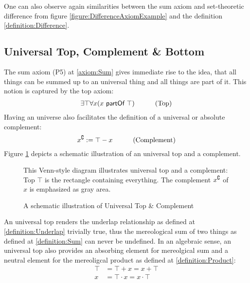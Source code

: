 One can also observe again similarities between the sum axiom and set-theoretic difference from figure \ref{figure:DifferenceAxiomExample} and the definition \ref{definition:Difference}.


\subsection{Universal Top, Complement \& Bottom}
\label{subsection:UniversalTopComplementAndBottom}
The sum axiom (P5) at \ref{axiom:Sum} gives immediate rise to the idea, that all things can be summed up to an universal thing and all things are part of it.
This notion is captured by the top axiom:
\begin{align}
&\exists \top \forall x (x ~\textsf{partOf}~ \top)
&\qquad \text{(Top)}
\label{axiom:Top}
\end{align}
Having an universe also facilitates the definition of a universal or absolute complement:
\begin{align}
&x^{\complement} := \top - x
&\qquad \text{(Complement)}
\label{definition:Complement}
\end{align}
Figure \ref{figure:SchematicUniversalTopAndComplement} depicts a schematic illustration of an universal top and a complement.

\begin{figure}[h!]
\begin{center}
\end{center}
{
\scriptsize 
This Venn-style diagram illustrates universal top and a complement:
Top $\top$ is the rectangle containing everything.
The complement $x^{\complement}$ of $x$ is emphasized as gray area.
}
\caption{A schematic illustration of Universal Top \& Complement}
\label{figure:SchematicUniversalTopAndComplement}
\end{figure}

An universal top renders the underlap relationship as defined at \ref{definition:Underlap} trivially true, thus the mereological sum of two things as defined at \ref{definition:Sum} can never be undefined.
In an algebraic sense, an universal top also provides an absorbing element for mereolgical sum and a neutral element for the mereoligcal product as defined at \ref{definition:Product}:
\begin{align}
\top &= \top + x = x + \top
\\
x &= \top \cdot x = x \cdot \top
\end{align}

